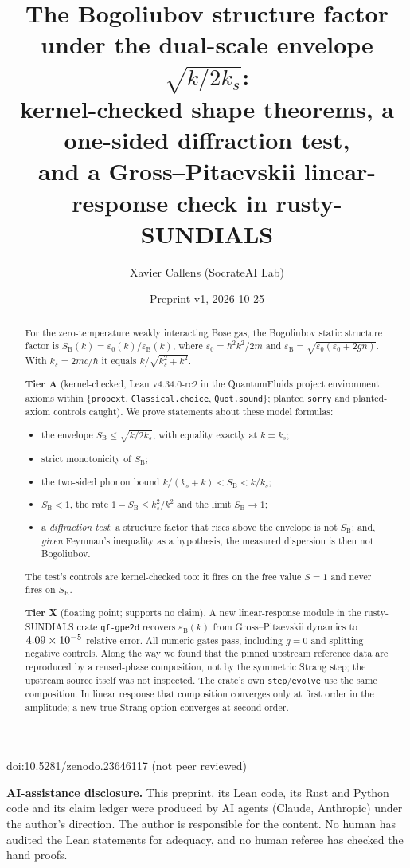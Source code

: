 \documentclass[11pt]{article}
\title{The Bogoliubov structure factor under the dual-scale envelope $\sqrt{k/2k_s}$:\\
kernel-checked shape theorems, a one-sided diffraction test,\\
and a Gross--Pitaevskii linear-response check in rusty-SUNDIALS}
\author{Xavier Callens (SocrateAI Lab)}
\date{Preprint v1, 2026-10-25}
\theoremstyle{remark}
\newcommand{\lean}[1]{\texttt{#1}}
\newcommand{\ks}{k_s}
\newcommand{\SB}{S_{\mathrm B}}
\newcommand{\eB}{\varepsilon_{\mathrm B}}
\begin{document}
\maketitle
\begin{center}\small doi:10.5281/zenodo.23646117 \quad (not peer reviewed)\end{center}


\noindent\textbf{AI-assistance disclosure.} This preprint, its Lean code, its Rust and Python code and its claim ledger
were produced by AI agents (Claude, Anthropic) under the author's direction. The author is responsible for the content.
No human has audited the Lean statements for adequacy, and no human referee has checked the hand proofs.

\begin{abstract}
For the zero-temperature weakly interacting Bose gas, the Bogoliubov static structure factor is
$\SB(k)=\varepsilon_0(k)/\eB(k)$, where $\varepsilon_0=\hbar^2k^2/2m$ and $\eB=\sqrt{\varepsilon_0(\varepsilon_0+2gn)}$.
With $\ks=2mc/\hbar$ it equals $k/\sqrt{\ks^2+k^2}$.

\textbf{Tier A} (kernel-checked, Lean v4.34.0-rc2 in the QuantumFluids project environment; axioms within
\{\lean{propext}, \lean{Classical.choice}, \lean{Quot.sound}\}; planted \lean{sorry} and planted-axiom controls caught).
We prove \NDecl{} statements about these model formulas:
\begin{itemize}
\item the envelope $\SB\le\sqrt{k/2\ks}$, with equality exactly at $k=\ks$;
\item strict monotonicity of $\SB$;
\item the two-sided phonon bound $k/(\ks+k)<\SB<k/\ks$;
\item $\SB<1$, the rate $1-\SB\le\ks^2/k^2$ and the limit $\SB\to1$;
\item a \emph{diffraction test}: a structure factor that rises above the envelope is not $\SB$; and, \emph{given}
Feynman's inequality as a hypothesis, the measured dispersion is then not Bogoliubov.
\end{itemize}
The test's controls are kernel-checked too: it fires on the free value $S=1$ and never fires on $\SB$.

\textbf{Tier X} (floating point; supports no claim). A new linear-response module in the rusty-SUNDIALS crate
\texttt{qf-gpe2d} recovers $\eB(k)$ from Gross--Pitaevskii dynamics to $4.09\times10^{-5}$ relative error. All \NGates{}
numeric gates pass, including $g=0$ and splitting negative controls. Along the way we found that the pinned upstream
reference data are reproduced by a reused-phase composition, not by the symmetric Strang step; the upstream source
itself was not inspected. The crate's own \texttt{step}/\texttt{evolve} use the same composition. In linear response that
composition converges only at first order in the amplitude; a new true Strang option converges at second order.


\end{abstract}
\end{document}
